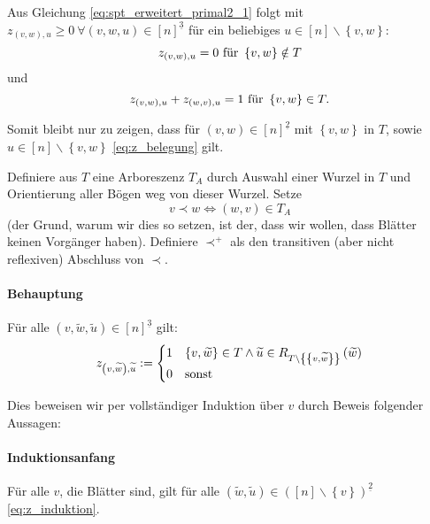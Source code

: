 \documentclass[10p,a4paper,BCOR = 12mm, DIV=15]{scrbook}
\begin{document}
\begin{bew}
Aus Gleichung \eqref{eq:spt_erweitert_primal2_1} folgt mit $z_{\left(v, w\right), u} \geq 0 \ \forall \left(v, w, u\right) \in \left[n\right]^{\underline{3}}$ für ein beliebiges $u \in \left[n\right] \backslash \left\{v, w\right\}$:
\begin{displaymath}
z_{\left(v, w\right), u} = 0 \textnormal{ für } \left\{v, w\right\}\notin T
\end{displaymath}
und 
\begin{displaymath}
z_{\left(v, w\right), u}+z_{\left(w, v\right), u} = 1 \textnormal{ für } \left\{v, w\right\}\in T.
\end{displaymath}

Somit bleibt nur zu zeigen, dass für $\left(v, w\right) \in \left[n\right]^{\underline{2}}$ mit $\left\{v, w\right\}$ in $T$, sowie $u \in \left[n\right] \backslash \left\{v, w\right\}$ \eqref{eq:z_belegung} gilt.

Definiere aus $T$ eine Arboreszenz $T_A$ durch Auswahl einer Wurzel in $T$ und Orientierung aller Bögen weg von dieser Wurzel. Setze
\begin{displaymath}
v\prec w \Leftrightarrow (w, v) \in T_A
\end{displaymath}
(der Grund, warum wir dies so setzen, ist der, dass wir wollen, dass Blätter keinen Vorgänger haben). Definiere $\prec^+$ als den transitiven (aber nicht reflexiven) Abschluss von $\prec$.

\paragraph{Behauptung} Für alle $\left(v, \widetilde{w}, \widetilde{u}\right)\in \left[n\right]^{\underline{3}}$ gilt:
\begin{align}
z_{\left(v, \widetilde{w}\right), \widetilde{u}} := \begin{cases}
1 & \left\{v, \widetilde{w}\right\}\in T\wedge \widetilde{u}\in R_{T\backslash \left\{\left\{v, \widetilde{w}\right\}\right\}}\left(\widetilde{w}\right)\\
0 & \textnormal{sonst}
\end{cases}
\label{eq:z_induktion}
\end{align}

Dies beweisen wir per vollständiger Induktion über $v$ durch Beweis folgender Aussagen:

\paragraph{Induktionsanfang} Für alle $v$, die Blätter sind, gilt  für alle $\left(\widetilde{w}, \widetilde{u}\right)\in \left(\left[n\right]\backslash \left\{v\right\}\right)^{\underline{2}}$ \eqref{eq:z_induktion}. \\


\end{bew}
\end{document}
